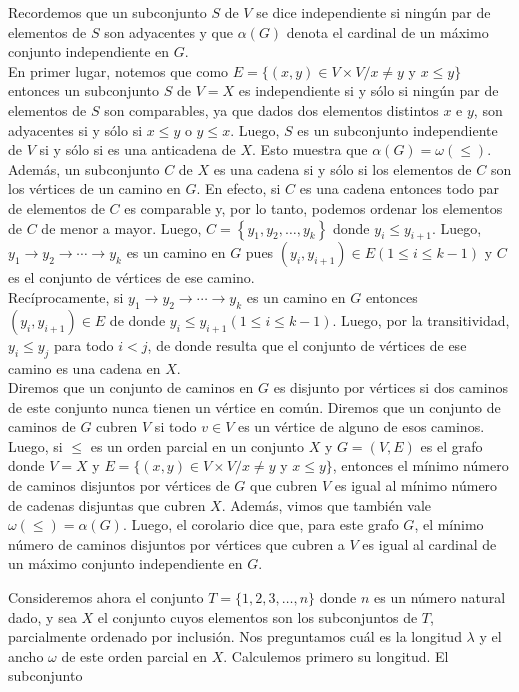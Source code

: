 \documentclass[10pt]{article}
\begin{document}
Recordemos que un subconjunto $S$ de $V$ se dice independiente si ningún par de elementos de $S$ son adyacentes y que $\alpha(G)$ denota el cardinal de un máximo conjunto independiente en $G$.\\
En primer lugar, notemos que como $E=\{(x, y) \in V \times V / x \neq y$ y $x \leq y\}$ entonces un subconjunto $S$ de $V=X$ es independiente si y sólo si ningún par de elementos de $S$ son comparables, ya que dados dos elementos distintos $x$ e $y$, son adyacentes si y sólo si $x \leq y$ o $y \leq x$. Luego, $S$ es un subconjunto independiente de $V$ si y sólo si es una anticadena de $X$. Esto muestra que $\alpha(G)=\omega(\leq)$.\\
Además, un subconjunto $C$ de $X$ es una cadena si y sólo si los elementos de $C$ son los vértices de un camino en $G$. En efecto, si $C$ es una cadena entonces todo par de elementos de $C$ es comparable y, por lo tanto, podemos ordenar los elementos de $C$ de menor a mayor. Luego, $C=\left\{y_{1}, y_{2}, \ldots, y_{k}\right\}$ donde $y_{i} \leq y_{i+1}$. Luego, $y_{1} \longrightarrow y_{2} \longrightarrow \cdots \longrightarrow y_{k}$ es un camino en $G$ pues $\left(y_{i}, y_{i+1}\right) \in E(1 \leq i \leq k-1)$ y $C$ es el conjunto de vértices de ese camino.\\
Recíprocamente, si $y_{1} \longrightarrow y_{2} \longrightarrow \cdots \longrightarrow y_{k}$ es un camino en $G$ entonces $\left(y_{i}, y_{i+1}\right) \in E$ de donde $y_{i} \leq y_{i+1}(1 \leq i \leq k-1)$. Luego, por la transitividad, $y_{i} \leq y_{j}$ para todo $i<j$, de donde resulta que el conjunto de vértices de ese camino es una cadena en $X$.\\
Diremos que un conjunto de caminos en $G$ es disjunto por vértices si dos caminos de este conjunto nunca tienen un vértice en común. Diremos que un conjunto de caminos de $G$ cubren $V$ si todo $v \in V$ es un vértice de alguno de esos caminos.\\
Luego, si $\leq$ es un orden parcial en un conjunto $X$ y $G=(V, E)$ es el grafo donde $V=X$ y $E=\{(x, y) \in V \times V / x \neq y$ y $x \leq y\}$, entonces el mínimo número de caminos disjuntos por vértices de $G$ que cubren $V$ es igual al mínimo número de cadenas disjuntas que cubren $X$. Además, vimos que también vale $\omega(\leq)=\alpha(G)$. Luego, el corolario dice que, para este grafo $G$, el mínimo número de caminos disjuntos por vértices que cubren a $V$ es igual al cardinal de un máximo conjunto independiente en $G$.

Consideremos ahora el conjunto $T=\{1,2,3, \ldots, n\}$ donde $n$ es un número natural dado, y sea $X$ el conjunto cuyos elementos son los subconjuntos de $T$, parcialmente ordenado por inclusión. Nos preguntamos cuál es la longitud $\lambda$ y el ancho $\omega$ de este orden parcial en $X$. Calculemos primero su longitud. El subconjunto
\end{document}
